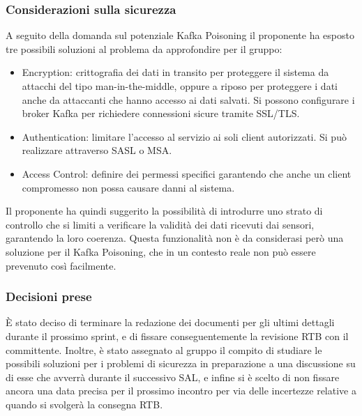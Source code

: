 \documentclass[10pt]{article}
\begin{document}
\subsubsection{Considerazioni sulla sicurezza}
A seguito della domanda sul potenziale Kafka Poisoning il proponente ha esposto tre possibili soluzioni al problema da approfondire per il gruppo:
\begin{itemize}
	\item Encryption: crittografia dei dati in transito per proteggere il sistema da attacchi del tipo man-in-the-middle, oppure a riposo
	per proteggere i dati anche da attaccanti che hanno accesso ai dati salvati. Si possono configurare i broker Kafka per richiedere connessioni
	sicure tramite SSL/TLS.
	\item Authentication: limitare l'accesso al servizio ai soli client autorizzati. Si può realizzare attraverso SASL o MSA. 
	\item Access Control: definire dei permessi specifici garantendo che anche un client compromesso non possa causare danni al sistema.
\end{itemize}
Il proponente ha quindi suggerito la possibilità di introdurre uno strato di controllo che si limiti a verificare la validità dei dati ricevuti
dai sensori, garantendo la loro coerenza. Questa funzionalità non è da considerasi però una soluzione per il Kafka Poisoning, che in un contesto reale non può 
essere prevenuto così facilmente.

\subsubsection{Decisioni prese}
È stato deciso di terminare la redazione dei documenti per gli ultimi dettagli durante il prossimo sprint, e di fissare conseguentemente la revisione RTB con il committente.
Inoltre, è stato assegnato al gruppo il compito di studiare le possibili soluzioni per i problemi di sicurezza in preparazione a una discussione su di esse
che avverrà durante il successivo SAL, e infine si è scelto di non fissare ancora una data precisa per il prossimo incontro per via delle incertezze
relative a quando si svolgerà la consegna RTB.
\end{document}
